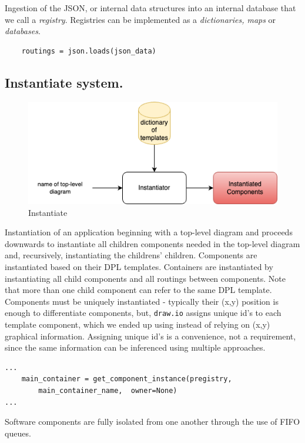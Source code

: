 \documentclass[10pt,anonymous,review]{acmart}
\begin{document}
  Ingestion of the JSON, or internal data structures into an internal database that we call a \emph{registry}. Registries can be implemented as a \emph{dictionaries, maps} or \emph{databases}.

\begin{verbatim}
    routings = json.loads(json_data)
\end{verbatim}

\subsection{Instantiate system.}
  \begin{figure}
    \includegraphics[scale=0.4]{./media/instantiate.png}
    \caption{Instantiate}
    \label{fig:instantiate_system}
  \end{figure}

  Instantiation\cite{run} of an application beginning with a top-level diagram
and proceeds downwards to instantiate all children components needed in
the top-level diagram and, recursively, instantiating the childrens'
children. Components are instantiated based on their DPL templates.
Containers are instantiated by instantiating all child components and
all routings between components. Note that more than one child component
can refer to the same DPL template. Components must be uniquely
instantiated - typically their (x,y) position is enough to differentiate
components, but, \texttt{draw.io} assigns unique
id's to each template component, which we ended up using instead of
relying on (x,y) graphical information. Assigning unique id's is a
convenience, not a requirement, since the same information can be inferenced 
using multiple approaches.


\begin{verbatim}
...
    main_container = get_component_instance(pregistry,
        main_container_name,  owner=None)
...
\end{verbatim}

Software components are fully isolated from one another through the use
of FIFO queues.
\end{document}
